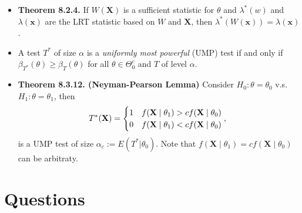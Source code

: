 \documentclass[12pt]{extarticle}
\newcommand{\x}{\mathbf x}
\newcommand{\X}{\mathbf X}
\begin{document}
\begin{itemize}
    \item \textbf{Theorem 8.2.4.} If $W(\mathbf X)$ is a sufficient statistic for $\theta$ and $\lambda^*(w)$ and $\lambda(\x)$ are the LRT statistic based on $W$ and $\mathbf X$, then $\lambda^*(W(\x)) = \lambda(\x)$.
    \item  A test $T^*$ of size $\alpha$ is a \textit{uniformly most powerful} (UMP) test if and only if $\beta_{T^*}(\theta) \geq \beta_T(\theta)$ for all $\theta \in \Theta_0^c$ and $T$ of level $\alpha$.
    \item \textbf{Theorem 8.3.12. (Neyman-Pearson Lemma)} Consider $H_0: \theta = \theta_0$ v.s. $H_1: \theta = \theta_1$, then
        $$T^*(\X) = \begin{cases}
            1 & f(\X\mid\theta_1) > cf(\X\mid\theta_0)\\
              0 & f(\X\mid\theta_1) < cf(\X\mid\theta_0)
        \end{cases},\hspace{1ex}$$ is a UMP test of size $\alpha_c:=E(T^*|\theta_0)$.
        Note that $f(\X\mid\theta_1) = cf(\X\mid\theta_0) $ can be arbitraty.
\end{itemize}


\section{Questions}
 
\end{document}
